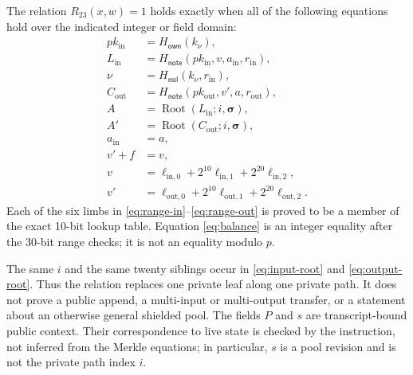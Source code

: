 \begin{definition}
\label{def:profile23-relation}
The relation \(R_{23}(x,w)=1\) holds exactly when all of the following
equations hold over the indicated integer or field domain:
\begin{align}
 pk_{\mathrm{in}}
   &=H_{\mathsf{own}}(k_\nu),                                                   \label{eq:owner-key}\\
 L_{\mathrm{in}}
   &=H_{\mathsf{note}}(pk_{\mathrm{in}},v,a_{\mathrm{in}},r_{\mathrm{in}}),    \label{eq:input-note}\\
 \nu
   &=H_{\mathsf{nul}}(k_\nu,r_{\mathrm{in}}),                                  \label{eq:nullifier}\\
 C_{\mathrm{out}}
   &=H_{\mathsf{note}}(pk_{\mathrm{out}},v',a,r_{\mathrm{out}}),               \label{eq:output-note}\\
 A
   &=\operatorname{Root}(L_{\mathrm{in}};i,\boldsymbol\sigma),                  \label{eq:input-root}\\
 A'
   &=\operatorname{Root}(C_{\mathrm{out}};i,\boldsymbol\sigma),                \label{eq:output-root}\\
 a_{\mathrm{in}}&=a,                                                            \label{eq:asset-equality}\\
 v' + f&=v,                                                                      \label{eq:balance}\tag{integer}\\
 v&=\ell_{\mathrm{in},0}+2^{10}\ell_{\mathrm{in},1}
       +2^{20}\ell_{\mathrm{in},2},                                             \label{eq:range-in}\\
 v'&=\ell_{\mathrm{out},0}+2^{10}\ell_{\mathrm{out},1}
       +2^{20}\ell_{\mathrm{out},2}.                                            \label{eq:range-out}
\end{align}
Each of the six limbs in \eqref{eq:range-in}--\eqref{eq:range-out} is
proved to be a member of the exact 10-bit lookup table.  Equation
\eqref{eq:balance} is an integer equality after the 30-bit range checks; it
is not an equality modulo \(p\).
\end{definition}

The same \(i\) and the same twenty siblings occur in
\eqref{eq:input-root} and \eqref{eq:output-root}.  Thus the relation replaces
one private leaf along one private path.  It does not prove a public append,
a multi-input or multi-output transfer, or a statement about an otherwise
general shielded pool.  The fields \(P\) and \(s\) are transcript-bound public
context.  Their correspondence to live state is checked by the instruction,
not inferred from the Merkle equations; in particular, \(s\) is a pool
revision and is not the private path index \(i\).

